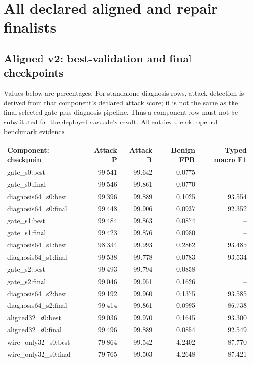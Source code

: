 \documentclass[11pt,a4paper,oneside]{report}
\begin{document}
\chapter{All declared aligned and repair finalists}
\section{Aligned v2: best-validation and final checkpoints}
Values below are percentages. For standalone diagnosis rows, attack detection is derived from that component's declared attack score; it is not the same as the final selected gate-plus-diagnosis pipeline. Thus a component row must not be substituted for the deployed cascade's result. All entries are old opened benchmark evidence.

{\small
\begin{longtable}{@{}p{}rrrr@{}}
\toprule
Component: checkpoint & Attack P & Attack R & Benign FPR & Typed macro F1\\\midrule\endhead
gate\_s0:best & 99.541 & 99.642 & 0.0775 & --\\
gate\_s0:final & 99.546 & 99.861 & 0.0770 & --\\
diagnosis64\_s0:best & 99.396 & 99.889 & 0.1025 & 93.554\\
diagnosis64\_s0:final & 99.448 & 99.906 & 0.0937 & 92.352\\
gate\_s1:best & 99.484 & 99.863 & 0.0874 & --\\
gate\_s1:final & 99.423 & 99.876 & 0.0980 & --\\
diagnosis64\_s1:best & 98.334 & 99.993 & 0.2862 & 93.485\\
diagnosis64\_s1:final & 99.538 & 99.778 & 0.0783 & 93.534\\
gate\_s2:best & 99.493 & 99.794 & 0.0858 & --\\
gate\_s2:final & 99.046 & 99.951 & 0.1626 & --\\
diagnosis64\_s2:best & 99.192 & 99.960 & 0.1375 & 93.585\\
diagnosis64\_s2:final & 99.414 & 99.861 & 0.0995 & 86.738\\
aligned32\_s0:best & 99.036 & 99.970 & 0.1645 & 93.300\\
aligned32\_s0:final & 99.496 & 99.889 & 0.0854 & 92.549\\
wire\_only32\_s0:best & 79.864 & 99.542 & 4.2402 & 87.770\\
wire\_only32\_s0:final & 79.765 & 99.503 & 4.2648 & 87.421\\
\bottomrule\end{longtable}
}
\end{document}
